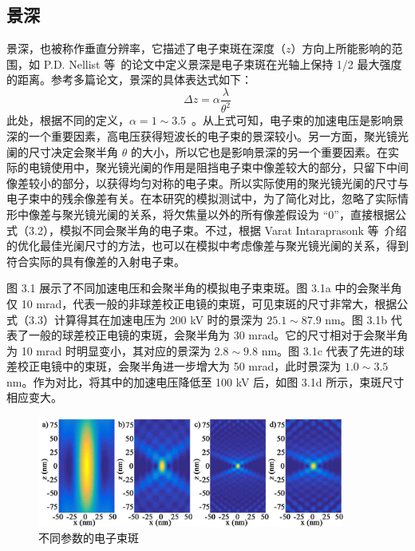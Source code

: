 \subsection{景深}
景深，也被称作垂直分辨率，它描述了电子束斑在深度（$z$）方向上所能影响的范围，如 P.D. Nellist 等~\cite{Nellist2007}的论文中定义景深是电子束斑在光轴上保持 1/2 最大强度的距离。参考多篇论文，景深的具体表达式如下：
\begin{equation}
\Delta z=\alpha \frac{\lambda}{\theta^2}
\end{equation}
此处，根据不同的定义，$\alpha=1 \sim3.5$~\cite{Ishikawa2015,Nellist2007,Born1980,Lee2013}。从上式可知，电子束的加速电压是影响景深的一个重要因素，高电压获得短波长的电子束的景深较小。另一方面，聚光镜光阑的尺寸决定会聚半角 $\theta$ 的大小，所以它也是影响景深的另一个重要因素。在实际的电镜使用中，聚光镜光阑的作用是阻挡电子束中像差较大的部分，只留下中间像差较小的部分，以获得均匀对称的电子束。所以实际使用的聚光镜光阑的尺寸与电子束中的残余像差有关。在本研究的模拟测试中，为了简化对比，忽略了实际情形中像差与聚光镜光阑的关系，将欠焦量以外的所有像差假设为 “0”，直接根据公式（3.2），模拟不同会聚半角的电子束。不过，根据 Varat Intaraprasonk 等~\cite{Intaraprasonk2008}介绍的优化最佳光阑尺寸的方法，也可以在模拟中考虑像差与聚光镜光阑的关系，得到符合实际的具有像差的入射电子束。

图 3.1 展示了不同加速电压和会聚半角的模拟电子束束斑。图 3.1a 中的会聚半角仅 10 mrad，代表一般的非球差校正电镜的束斑，可见束斑的尺寸非常大，根据公式（3.3）计算得其在加速电压为 200 kV 时的景深为 $25.1 \sim 87.9$ nm。图 3.1b 代表了一般的球差校正电镜的束斑，会聚半角为 30 mrad。它的尺寸相对于会聚半角为 10 mrad 时明显变小，其对应的景深为 $2.8 \sim 9.8$ nm。图 3.1c 代表了先进的球差校正电镜中的束斑，会聚半角进一步增大为 50 mrad，此时景深为 $1.0 \sim 3.5$ nm。作为对比，将其中的加速电压降低至 100 kV 后，如图 3.1d 所示，束斑尺寸相应变大。

\begin{figure}[H]
	\vspace{\baselineskip}
	\centering
	\includegraphics[width=0.9\textwidth]{../4.11/411}
	\caption{不同参数的电子束斑}\label{fig:413}
	\song{}
\end{figure}

